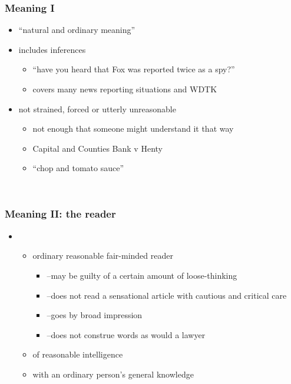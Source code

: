 \documentclass[ignorenonframetext,]{beamer}
\begin{document}
\begin{frame}
\frametitle{Meaning I}

\begin{itemize}
\item  ``natural and ordinary meaning''
\item  includes inferences

  \begin{itemize}
  \item    ``have you heard that Fox was reported twice as a spy?''
  \item    covers many news reporting situations and WDTK
  \end{itemize}
\item  not strained, forced or utterly unreasonable

  \begin{itemize}
  \item    not enough that someone {might}{ understand it that way}
  \item    {Capital and Counties Bank v Henty}
  \item    {``}{chop and tomato sauce''}
  \end{itemize}
\end{itemize}

~


\end{frame}

\begin{frame}
\frametitle{Meaning II: the reader}

\begin{itemize}
\item  \begin{itemize}
  \item    ordinary reasonable fair-minded reader

    \begin{itemize}
    \item      {--}may be guilty of a certain amount of loose-thinking
    \item      {--}does not read a sensational article with cautious and critical
      care
    \item      {--}goes by broad impression
    \item      {--}does not construe words as would a lawyer
    \end{itemize}
  \item    of reasonable intelligence
  \item    with an ordinary person's general knowledge
  \end{itemize}
\end{itemize}

~


\end{frame}
\end{document}
